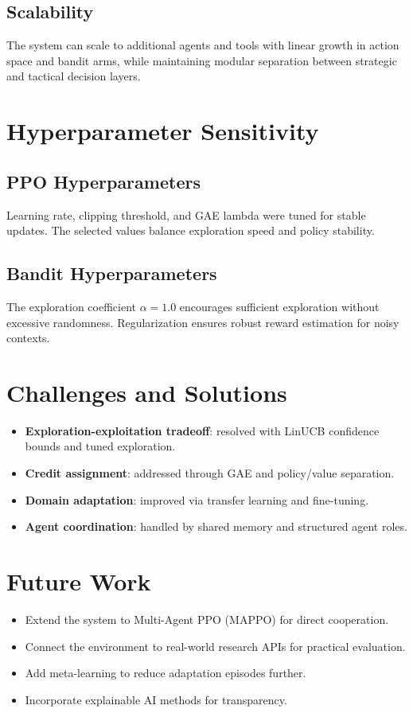 \documentclass[11pt,a4paper]{article}
\begin{document}
\subsection{Scalability}
The system can scale to additional agents and tools with linear growth in action space and bandit arms, while maintaining modular separation between strategic and tactical decision layers.

\section{Hyperparameter Sensitivity}
\subsection{PPO Hyperparameters}
Learning rate, clipping threshold, and GAE lambda were tuned for stable updates. The selected values balance exploration speed and policy stability.

\subsection{Bandit Hyperparameters}
The exploration coefficient $\alpha=1.0$ encourages sufficient exploration without excessive randomness. Regularization ensures robust reward estimation for noisy contexts.

\section{Challenges and Solutions}
\begin{itemize}[leftmargin=*]
  \item \textbf{Exploration-exploitation tradeoff}: resolved with LinUCB confidence bounds and tuned exploration.
  \item \textbf{Credit assignment}: addressed through GAE and policy/value separation.
  \item \textbf{Domain adaptation}: improved via transfer learning and fine-tuning.
  \item \textbf{Agent coordination}: handled by shared memory and structured agent roles.
\end{itemize}

\section{Future Work}
\begin{itemize}[leftmargin=*]
  \item Extend the system to Multi-Agent PPO (MAPPO) for direct cooperation.
  \item Connect the environment to real-world research APIs for practical evaluation.
  \item Add meta-learning to reduce adaptation episodes further.
  \item Incorporate explainable AI methods for transparency.
\end{itemize}
\end{document}
